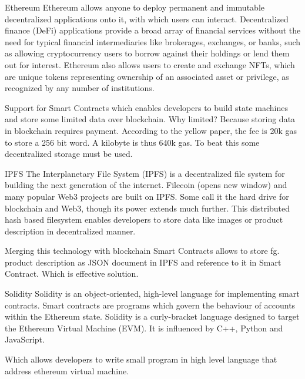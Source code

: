 \documentclass[9pt]{beamer}
\begin{document}
\begin{frame}{Ethereum}
    Ethereum allows anyone to deploy permanent and immutable decentralized applications onto it, with which users can interact. Decentralized finance (DeFi) applications provide a broad array of financial services without the need for typical financial intermediaries like brokerages, exchanges, or banks, such as allowing cryptocurrency users to borrow against their holdings or lend them out for interest. Ethereum also allows users to create and exchange NFTs, which are unique tokens representing ownership of an associated asset or privilege, as recognized by any number of institutions.
    
    Support for Smart Contracts which enables developers to build state machines and store some limited data over blockchain. Why limited? Because storing data in blockchain requires payment. According to the yellow paper, the fee is 20k gas to store a 256 bit word. A kilobyte is thus 640k gas. To beat this some decentralized storage must be used. 
\end{frame}

\begin{frame}{IPFS}
    The Interplanetary File System (IPFS) is a decentralized file system for building the next generation of the internet. Filecoin (opens new window) and many popular Web3 projects are built on IPFS. Some call it the hard drive for blockchain and Web3, though its power extends much further. This distributed hash based filesystem enables developers to store data like images or product description in decentralized manner. 
    
    Merging this technology with blockchain Smart Contracts allows to store fg. product description as JSON document in IPFS and reference to it in Smart Contract. Which is effective solution.
\end{frame}

\begin{frame}{Solidity}
    Solidity is an object-oriented, high-level language for implementing smart contracts. Smart contracts are programs which govern the behaviour of accounts within the Ethereum state. Solidity is a curly-bracket language designed to target the Ethereum Virtual Machine (EVM). It is influenced by C++, Python and JavaScript.
    
    Which allows developers to write small program in high level language that address ethereum virtual machine.
\end{frame}
\end{document}
